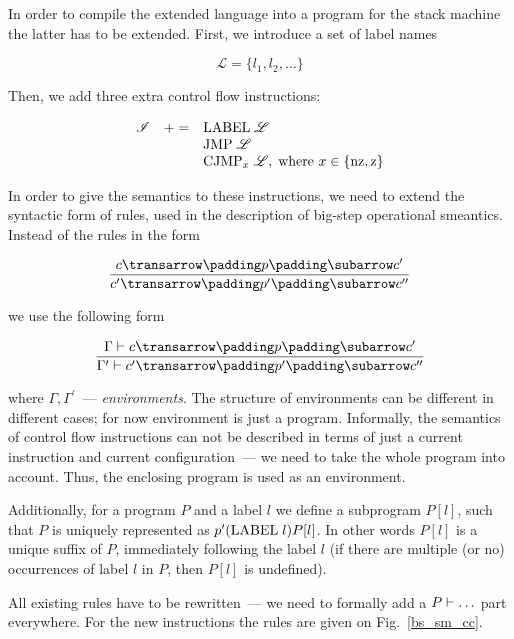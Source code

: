 In order to compile the extended language into a program for the stack machine the latter has to be extended. First, we introduce a set of label names

\[
\mathscr L = \{l_1, l_2, \dots\}
\]

Then, we add three extra control flow instructions:

\[
\begin{array}{rcl}
  \mathscr I & += & \llang{LABEL $\;\mathscr L$} \\
             &   & \llang{JMP $\;\mathscr L$} \\
  &   & \llang{CJMP$_x$ $\;\mathscr L$},\;\mbox{where $x\in\{\llang{nz}, \llang{z}\}$}
\end{array}
\]

In order to give the semantics to these instructions, we need to extend the syntactic form of rules, used in the description of big-step operational smeantics. Instead of
the rules in the form

\setarrow{\xRightarrow}

\[
\trule{\trans{c}{p}{c^\prime}}{\trans{c^\prime}{p^\prime}{c^{\prime\prime}}}
\]

we use the following form

\[
\trule{\withenv{\Gamma}{\trans{c}{p}{c^\prime}}}{\withenv{\Gamma^\prime}{\trans{c^\prime}{p^\prime}{c^{\prime\prime}}}}
\]

where $\Gamma, \Gamma^\prime$~--- \emph{environments}. The structure of environments can be different in different cases; for now environment is just a program. Informally,
the semantics of control flow instructions can not be described in terms of just a current instruction and current configuration~--- we need to take the whole
program into account. Thus, the enclosing program is used as an environment.

Additionally, for a program $P$ and a label $l$ we define a subprogram $P[l]$, such that $P$ is uniquely represented as $p^\prime(\llang{LABEL $\;l$})P[l]$.
In other words $P[l]$ is a unique suffix of $P$, immediately following the label $l$ (if there are multiple (or no) occurrences of label $l$ in $P$, then $P[l]$ is
undefined).

All existing rules have to be rewritten~--- we need to formally add a ${P}\vdash{\dots}$ part everywhere. For the new instructions the rules are given on Fig.~\ref{bs_sm_cc}.

